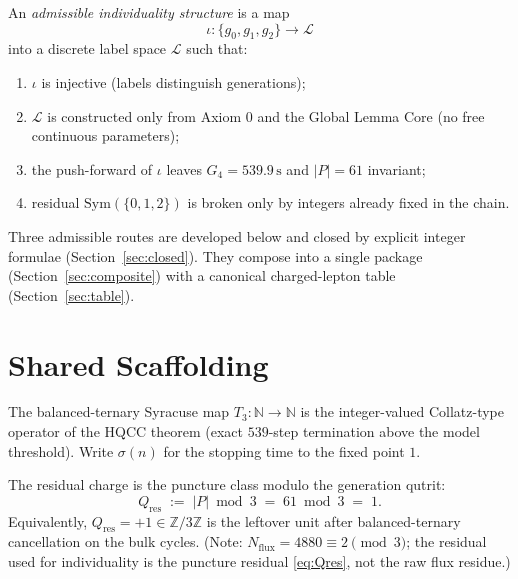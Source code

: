 \begin{definition}
An \emph{admissible individuality structure} is a map
\[
\iota\colon \{g_0,g_1,g_2\}\longrightarrow \mathcal{L}
\]
into a discrete label space \(\mathcal{L}\) such that:
\begin{enumerate}[label=(\roman*)]
  \item \(\iota\) is injective (labels distinguish generations);
  \item \(\mathcal{L}\) is constructed only from Axiom 0 and the Global Lemma Core
        (no free continuous parameters);
  \item the push-forward of \(\iota\) leaves \(G_4=539.9\,\mathrm{s}\) and
        \(|P|=61\) invariant;
  \item residual \(\mathrm{Sym}(\{0,1,2\})\) is broken only by integers already
        fixed in the chain.
\end{enumerate}
\end{definition}

Three admissible routes are developed below and closed by explicit integer
formulae (Section~\ref{sec:closed}). They compose into a single package
(Section~\ref{sec:composite}) with a canonical charged-lepton table
(Section~\ref{sec:table}).

\section{Shared Scaffolding}
\label{sec:scaffold}

\begin{definition}
\label{def:T3}
The balanced-ternary Syracuse map \(T_3\colon\mathbb{N}\to\mathbb{N}\) is the
integer-valued Collatz-type operator of the HQCC theorem (exact \(539\)-step
termination above the model threshold). Write \(\sigma(n)\) for the stopping
time to the fixed point \(1\).
\end{definition}

\begin{definition}
\label{def:residual}
The residual charge is the puncture class modulo the generation qutrit:
\begin{equation}
\label{eq:Qres}
Q_{\mathrm{res}}\;:=\; |P|\bmod 3 \;=\; 61\bmod 3 \;=\; 1.
\end{equation}
Equivalently, \(Q_{\mathrm{res}}=+1\in\mathbb{Z}/3\mathbb{Z}\) is the leftover unit
after balanced-ternary cancellation on the bulk cycles. (Note:
\(N_{\mathrm{flux}}=4880\equiv 2\pmod{3}\); the residual used for individuality is
the puncture residual \eqref{eq:Qres}, not the raw flux residue.)
\end{definition}

